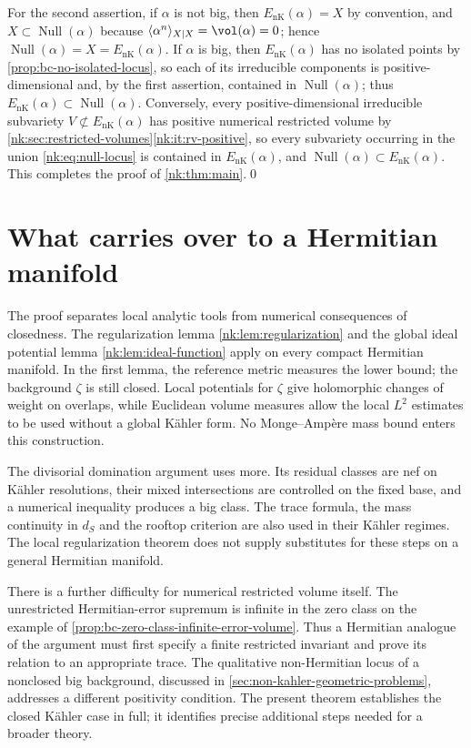 For the second assertion, if $\alpha$ is not big, then
${E_{\mathrm{nK}}}(\alpha)=X$ by convention, and $X\subset\operatorname{Null}(\alpha)$ because
$\langle\alpha^n\rangle_{X\mid X}=\vol(\alpha)=0$; hence
$\operatorname{Null}(\alpha)=X={E_{\mathrm{nK}}}(\alpha)$. If $\alpha$ is big, then
${E_{\mathrm{nK}}}(\alpha)$ has no isolated points by \cref{prop:bc-no-isolated-locus}, so
each of its irreducible components is positive-dimensional and, by the
first assertion, contained in $\operatorname{Null}(\alpha)$; thus
${E_{\mathrm{nK}}}(\alpha)\subset\operatorname{Null}(\alpha)$. Conversely, every
positive-dimensional irreducible subvariety $V\not\subset{E_{\mathrm{nK}}}(\alpha)$
has positive numerical restricted volume by
\cref{nk:sec:restricted-volumes}\ref{nk:it:rv-positive}, so every subvariety
occurring in the union \eqref{nk:eq:null-locus} is contained in
${E_{\mathrm{nK}}}(\alpha)$, and $\operatorname{Null}(\alpha)\subset{E_{\mathrm{nK}}}(\alpha)$. This completes
the proof of \cref{nk:thm:main}.\qed


\section{What carries over to a Hermitian manifold}

The proof separates local analytic tools from numerical consequences of
closedness. The regularization lemma \ref{nk:lem:regularization} and the
global ideal potential lemma \ref{nk:lem:ideal-function} apply on every
compact Hermitian manifold. In the first lemma, the reference metric
measures the lower bound; the background $\zeta$ is still closed. Local
potentials for $\zeta$ give holomorphic changes of weight on overlaps,
while Euclidean volume measures allow the local $L^2$ estimates to be
used without a global K\"ahler form. No Monge--Amp\`ere mass bound enters
this construction.

The divisorial domination argument uses more. Its residual classes are
nef on K\"ahler resolutions, their mixed intersections are controlled on
the fixed base, and a numerical inequality produces a big class. The
trace formula, the mass continuity in $d_S$ and the rooftop criterion are
also used in their K\"ahler regimes. The local regularization theorem
does not supply substitutes for these steps on a general Hermitian
manifold.

There is a further difficulty for numerical restricted volume itself.
The unrestricted Hermitian-error supremum is infinite in the zero class
on the example of \cref{prop:bc-zero-class-infinite-error-volume}.
Thus a Hermitian analogue of the argument must first specify a finite
restricted invariant and prove its relation to an appropriate trace.
The qualitative non-Hermitian locus of a nonclosed big background,
discussed in \cref{sec:non-kahler-geometric-problems}, addresses a
different positivity condition. The present theorem establishes the
closed K\"ahler case in full; it identifies precise additional steps
needed for a broader theory.
